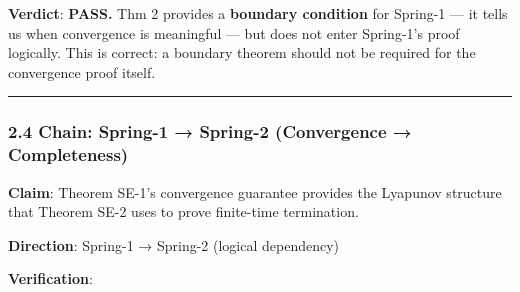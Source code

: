 \documentclass[
  12pt,
]{article}
\begin{document}
\textbf{Verdict}: \textbf{PASS.} Thm 2 provides a \textbf{boundary
condition} for Spring-1 --- it tells us when convergence is meaningful
--- but does not enter Spring-1's proof logically. This is correct: a
boundary theorem should not be required for the convergence proof
itself.

\begin{center}\rule{0.5\linewidth}{0.5pt}\end{center}

\subsubsection{2.4 Chain: Spring-1 → Spring-2 (Convergence →
Completeness)}\label{chain-spring-1-spring-2-convergence-completeness}

\textbf{Claim}: Theorem SE-1's convergence guarantee provides the
Lyapunov structure that Theorem SE-2 uses to prove finite-time
termination.

\textbf{Direction}: Spring-1 → Spring-2 (logical dependency)

\textbf{Verification}:
\end{document}

